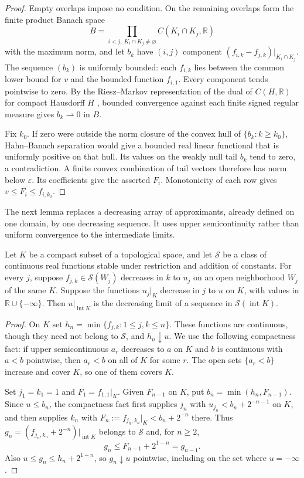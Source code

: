 \documentclass[11pt,a4paper]{amsart}
\begin{document}
\begin{proof}
Empty overlaps impose no condition. On the remaining overlaps form the finite product Banach space
\[
B=\prod_{i<j,\ K_i\cap K_j\ne\varnothing} C(K_i\cap K_j,\mathbb{R})
\]
with the maximum norm, and let $b_k$ have $(i,j)$ component $(f_{i,k}-f_{j,k})|_{K_i\cap K_j}$. The sequence $(b_k)$ is uniformly bounded: each $f_{i,k}$ lies between the common lower bound for $v$ and the bounded function $f_{i,1}$. Every component tends pointwise to zero. By the Riesz--Markov representation of the dual of $C(H,\mathbb{R})$ for compact Hausdorff $H$ \cite[Theorem~18.1]{SchenkerFA}, bounded convergence against each finite signed regular measure gives $b_k\rightharpoonup0$ in $B$.

Fix $k_0$. If zero were outside the norm closure of the convex hull of $\{b_k:k\geq k_0\}$, Hahn--Banach separation \cite[Theorem~2.1]{ButtenschoenHB} would give a bounded real linear functional that is uniformly positive on that hull. Its values on the weakly null tail $b_k$ tend to zero, a contradiction. A finite convex combination of tail vectors therefore has norm below $\varepsilon$. Its coefficients give the asserted $F_i$. Monotonicity of each row gives $v\leq F_i\leq f_{i,k_0}$.
\end{proof}

The next lemma replaces a decreasing array of approximants, already defined on one domain, by one decreasing sequence. It uses upper semicontinuity rather than uniform convergence to the intermediate limits.

\begin{lemma}
\label{lem:fixed-domain-diagonal}
Let $K$ be a compact subset of a topological space, and let $\mathscr{S}$ be a class of continuous real functions stable under restriction and addition of constants. For every $j$, suppose $f_{j,k}\in\mathscr{S}(W_j)$ decreases in $k$ to $u_j$ on an open neighborhood $W_j$ of the same $K$. Suppose the functions $u_j|_K$ decrease in $j$ to $u$ on $K$, with values in $\mathbb{R}\cup\{-\infty\}$. Then $u|_{\operatorname{int}K}$ is the decreasing limit of a sequence in $\mathscr{S}(\operatorname{int}K)$.
\end{lemma}

\begin{proof}
On $K$ set $h_n=\min\{f_{j,k}:1\leq j,k\leq n\}$. These functions are continuous, though they need not belong to $\mathscr{S}$, and $h_n\downarrow u$. We use the following compactness fact: if upper semicontinuous $a_r$ decreases to $a$ on $K$ and $b$ is continuous with $a<b$ pointwise, then $a_r<b$ on all of $K$ for some $r$. The open sets $\{a_r<b\}$ increase and cover $K$, so one of them covers $K$.

Set $j_1=k_1=1$ and $F_1=f_{1,1}|_K$. Given $F_{n-1}$ on $K$, put $b_n=\min(h_n,F_{n-1})$. Since $u\leq b_n$, the compactness fact first supplies $j_n$ with $u_{j_n}<b_n+2^{-n-1}$ on $K$, and then supplies $k_n$ with $F_n:=f_{j_n,k_n}|_K<b_n+2^{-n}$ there. Thus $g_n=(f_{j_n,k_n}+2^{-n})|_{\operatorname{int}K}$ belongs to $\mathscr{S}$ and, for $n\geq2$,
\[
g_n\leq F_{n-1}+2^{1-n}=g_{n-1}.
\]
Also $u\leq g_n\leq h_n+2^{1-n}$, so $g_n\downarrow u$ pointwise, including on the set where $u=-\infty$.
\end{proof}
\end{document}
